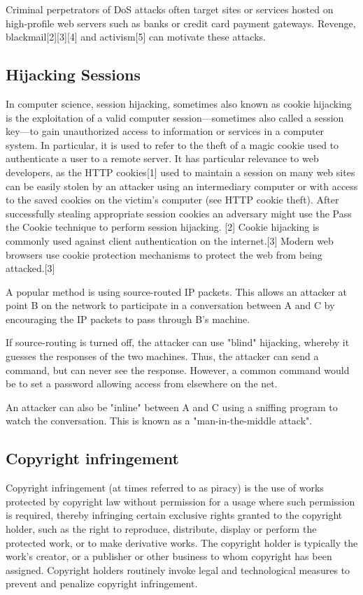 Criminal perpetrators of DoS attacks often target sites or services hosted on high-profile web servers such as banks or
credit card payment gateways.
Revenge, blackmail[2][3][4] and activism[5] can motivate these attacks.

\subsection{Hijacking Sessions}\label{subsec:hijacking-sessions}
In computer science, session hijacking, sometimes also known as cookie hijacking is the exploitation of a valid computer
session—sometimes also called a session key—to gain unauthorized access to information or services in a computer system.
In particular, it is used to refer to the theft of a magic cookie used to authenticate a user to a remote server.
It has particular relevance to web developers, as the HTTP cookies[1] used to maintain a session on many web sites
can be easily stolen by an attacker using an intermediary computer or with access to the saved cookies on the victim's
computer (see HTTP cookie theft).
After successfully stealing appropriate session cookies an adversary might use the Pass the Cookie technique to perform
session hijacking. [2]
Cookie hijacking is commonly used against client authentication on the internet.[3] Modern web browsers use cookie
protection mechanisms to protect the web from being attacked.[3]

A popular method is using source-routed IP packets.
This allows an attacker at point B on the network to participate in a conversation between A and C by encouraging the
IP packets to pass through B's machine.

If source-routing is turned off, the attacker can use "blind" hijacking, whereby it guesses the responses of the two
machines.
Thus, the attacker can send a command, but can never see the response.
However, a common command would be to set a password allowing access from elsewhere on the net.

An attacker can also be "inline" between A and C using a sniffing program to watch the conversation.
This is known as a "man-in-the-middle attack".

\subsection{Copyright infringement}\label{subsec:copyright-infringement}
Copyright infringement (at times referred to as piracy) is the use of works protected by copyright law without
permission for a usage where such permission is required, thereby infringing certain exclusive rights granted to the
copyright holder, such as the right to reproduce, distribute, display or perform the protected work, or to make
derivative works.
The copyright holder is typically the work's creator, or a publisher or other business to whom copyright has been assigned.
Copyright holders routinely invoke legal and technological measures to prevent and penalize copyright infringement.

